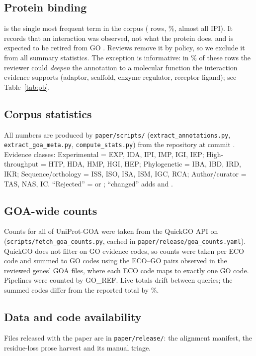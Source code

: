 \subsection{Protein binding}\label{sec:methods-pb}
 is the single most frequent term in the corpus (\nPB{} rows, \pctPB\%,
almost all IPI). It records that an interaction was observed, not what the protein does, and is
expected to be retired from GO . Reviews remove it by policy, so we exclude it from all
summary statistics. The exception is informative: in \pbModify\% of these rows the reviewer could
\emph{deepen} the annotation to a molecular function the interaction evidence supports (adaptor,
scaffold, enzyme regulator, receptor ligand); see Table~\ref{tab:pb}.

\subsection{Corpus statistics} All numbers are produced by \texttt{paper/scripts/}
(\texttt{extract\_annotations.py}, \texttt{extract\_goa\_meta.py}, \texttt{compute\_stats.py}) from
the repository at commit . Evidence classes: Experimental = EXP, IDA, IPI, IMP, IGI, IEP;
High-throughput = HTP, HDA, HMP, HGI, HEP; Phylogenetic = IBA, IBD, IRD, IKR; Sequence/orthology =
ISS, ISO, ISA, ISM, IGC, RCA; Author/curator = TAS, NAS, IC. ``Rejected'' =  or
; ``changed'' adds  and .
\subsection{GOA-wide counts}
Counts for all of UniProt-GOA were taken from the QuickGO API on \goaFetched{}
(\texttt{scripts/fetch\_goa\_counts.py}, cached in \texttt{paper/release/goa\_counts.yaml}). QuickGO does not
filter on GO evidence codes, so counts were taken per ECO code and summed to GO codes using the ECO--GO pairs
observed in the reviewed genes' GOA files, where each ECO code maps to exactly one GO code. Pipelines were
counted by GO\_REF. Live totals drift between queries; the summed codes differ from the reported total by
\goaResidualPct\%.

\subsection{Data and code availability}  Files released with the paper are in
\texttt{paper/release/}: the alignment manifest, the residue-loss prose harvest and its manual triage.
